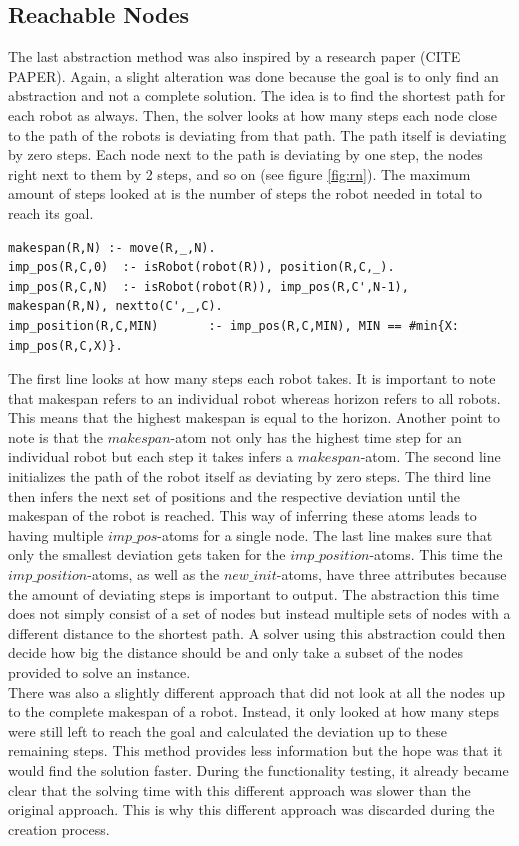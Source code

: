 \documentclass[runningheads]{llncs}
\begin{document}
\subsection{Reachable Nodes}
The last abstraction method was also inspired by a research paper (CITE PAPER). Again, a slight alteration was done because the goal is to only find an abstraction and not a complete solution. The idea is to find the shortest path for each robot as always. Then, the solver looks at how many steps each node close to the path of the robots is deviating from that path. The path itself is deviating by zero steps. Each node next to the path is deviating by one step, the nodes right next to them by 2  steps, and so on (see figure \ref{fig:rn}). The maximum amount of steps looked at is the number of steps the robot needed in total to reach its goal. 
\begin{verbatim}
makespan(R,N) :- move(R,_,N).
imp_pos(R,C,0) 	:- isRobot(robot(R)), position(R,C,_).
imp_pos(R,C,N) 	:- isRobot(robot(R)), imp_pos(R,C',N-1), makespan(R,N), nextto(C',_,C).
imp_position(R,C,MIN) 		:- imp_pos(R,C,MIN), MIN == #min{X: imp_pos(R,C,X)}.
\end{verbatim}
The first line looks at how many steps each robot takes. It is important to note that makespan refers to an individual robot whereas horizon refers to all robots. This means that the highest makespan is equal to the horizon. Another point to note is that the $makespan$-atom not only has the highest time step for an individual robot but each step it takes infers a $makespan$-atom. The second line initializes the path of the robot itself as deviating by zero steps. The third line then infers the next set of positions and the respective deviation until the makespan of the robot is reached. This way of inferring these atoms leads to having multiple $imp\_pos$-atoms for a single node. The last line makes sure that only the smallest deviation gets taken for the $imp\_position$-atoms. This time the $imp\_position$-atoms, as well as the $new\_init$-atoms, have three attributes because the amount of deviating steps is important to output. The abstraction this time does not simply consist of a set of nodes but instead multiple sets of nodes with a different distance to the shortest path. A solver using this abstraction could then decide how big the distance should be and only take a subset of the nodes provided to solve an instance. \\
There was also a slightly different approach that did not look at all the nodes up to the complete makespan of a robot. Instead, it only looked at how many steps were still left to reach the goal and calculated the deviation up to these remaining steps. This method provides less information but the hope was that it would find the solution faster. During the functionality testing, it already became clear that the solving time with this different approach was slower than the original approach. This is why this different approach was discarded during the creation process.
\end{document}

